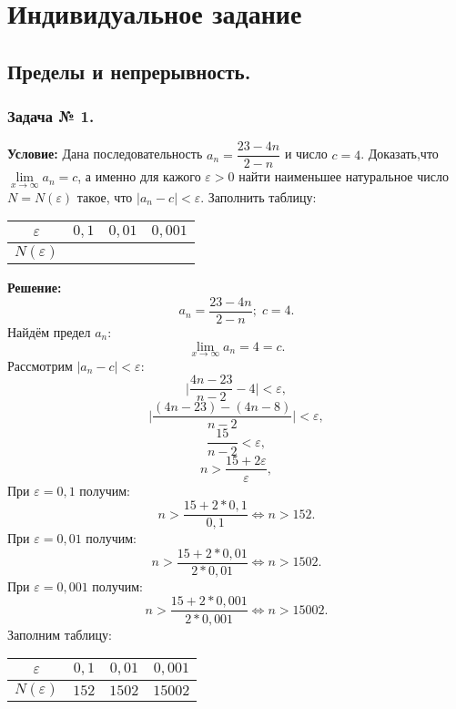 \documentclass[12pt]{article}
\newcommand{\eps}{\varepsilon}
\begin{document}
\newpage
\section{Индивидуальное задание}
%
\subsection{Пределы и непрерывность.}
\subsubsection*{\center Задача № 1.}

\textbf{Условие:}
Дана последовательность $a_{n}=\dfrac{23-4n}{2-n}$ и число $c=4$. Доказать,что $\lim\limits_{x\rightarrow\infty} a_{n}=c$, а именно для кажого $\eps > 0$ найти наименьшее натуральное число $N = N(\eps)$ такое, что $|a_{n}-c|<\eps$. Заполнить таблицу:
\begin{table}[h]
\centering
\begin{tabular}{|c|c|c|c|}
\hline
$\eps$ & $0,1$ & $0,01$ & $0,001$ \\
\hline
$N(\eps)$ & & & \\
\hline
\end{tabular}
\end{table}
\textbf{Решение:}
$$a_{n}=\dfrac{23-4n}{2-n}; \; c = 4.$$
Найдём предел $a_{n}$:
$$\lim\limits_{x\rightarrow\infty} a_{n}= 4 = c.$$
Рассмотрим $|a_{n}-c|<\eps$:
$$\biggl |\dfrac{4n-23}{n-2} - 4 \biggr |<\eps,$$
$$\biggl |\dfrac{(4n-23)-(4n-8)}{n-2} \biggr | <\eps,$$
$$\dfrac{15}{n-2} < \eps,$$
$$ n> \dfrac{15+2\eps}{\eps}, $$
При $\eps = 0,1$ получим:
$$ n > \dfrac{15+2*0,1}{0,1} \Leftrightarrow n > 152.$$
При $\eps = 0,01$ получим:
$$ n > \dfrac{15+2*0,01}{2*0,01} \Leftrightarrow n > 1502.$$
При $\eps = 0,001$ получим:
$$ n > \dfrac{15+2*0,001}{2*0,001} \Leftrightarrow n > 15002.$$
Заполним таблицу:
\begin{table}[h]
\centering
\begin{tabular}{|c|c|c|c|}
\hline
$\eps$ & $0,1$ & $0,01$ & $0,001$ \\
\hline
$N(\eps)$ & $152$ & $1502$ & $15002$ \\
\hline
\end{tabular}
\end{table}
\newpage
\end{document}
